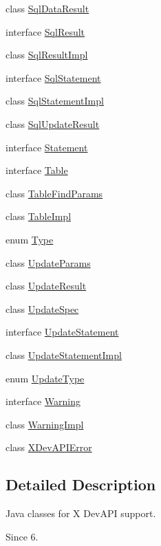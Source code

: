 \begin{DoxyCompactItemize}
class \mbox{\hyperlink{classcom_1_1mysql_1_1cj_1_1xdevapi_1_1_sql_data_result}{Sql\+Data\+Result}}
\item 
interface \mbox{\hyperlink{interfacecom_1_1mysql_1_1cj_1_1xdevapi_1_1_sql_result}{Sql\+Result}}
\item 
class \mbox{\hyperlink{classcom_1_1mysql_1_1cj_1_1xdevapi_1_1_sql_result_impl}{Sql\+Result\+Impl}}
\item 
interface \mbox{\hyperlink{interfacecom_1_1mysql_1_1cj_1_1xdevapi_1_1_sql_statement}{Sql\+Statement}}
\item 
class \mbox{\hyperlink{classcom_1_1mysql_1_1cj_1_1xdevapi_1_1_sql_statement_impl}{Sql\+Statement\+Impl}}
\item 
class \mbox{\hyperlink{classcom_1_1mysql_1_1cj_1_1xdevapi_1_1_sql_update_result}{Sql\+Update\+Result}}
\item 
interface \mbox{\hyperlink{interfacecom_1_1mysql_1_1cj_1_1xdevapi_1_1_statement}{Statement}}
\item 
interface \mbox{\hyperlink{interfacecom_1_1mysql_1_1cj_1_1xdevapi_1_1_table}{Table}}
\item 
class \mbox{\hyperlink{classcom_1_1mysql_1_1cj_1_1xdevapi_1_1_table_find_params}{Table\+Find\+Params}}
\item 
class \mbox{\hyperlink{classcom_1_1mysql_1_1cj_1_1xdevapi_1_1_table_impl}{Table\+Impl}}
\item 
enum \mbox{\hyperlink{enumcom_1_1mysql_1_1cj_1_1xdevapi_1_1_type}{Type}}
\item 
class \mbox{\hyperlink{classcom_1_1mysql_1_1cj_1_1xdevapi_1_1_update_params}{Update\+Params}}
\item 
class \mbox{\hyperlink{classcom_1_1mysql_1_1cj_1_1xdevapi_1_1_update_result}{Update\+Result}}
\item 
class \mbox{\hyperlink{classcom_1_1mysql_1_1cj_1_1xdevapi_1_1_update_spec}{Update\+Spec}}
\item 
interface \mbox{\hyperlink{interfacecom_1_1mysql_1_1cj_1_1xdevapi_1_1_update_statement}{Update\+Statement}}
\item 
class \mbox{\hyperlink{classcom_1_1mysql_1_1cj_1_1xdevapi_1_1_update_statement_impl}{Update\+Statement\+Impl}}
\item 
enum \mbox{\hyperlink{enumcom_1_1mysql_1_1cj_1_1xdevapi_1_1_update_type}{Update\+Type}}
\item 
interface \mbox{\hyperlink{interfacecom_1_1mysql_1_1cj_1_1xdevapi_1_1_warning}{Warning}}
\item 
class \mbox{\hyperlink{classcom_1_1mysql_1_1cj_1_1xdevapi_1_1_warning_impl}{Warning\+Impl}}
\item 
class \mbox{\hyperlink{classcom_1_1mysql_1_1cj_1_1xdevapi_1_1_x_dev_a_p_i_error}{X\+Dev\+A\+P\+I\+Error}}
\end{DoxyCompactItemize}


\subsection{Detailed Description}
Java classes for X Dev\+A\+PI support.

\begin{DoxySince}{Since}
6. 
\end{DoxySince}
